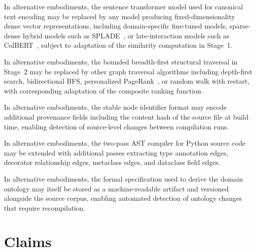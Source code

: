 \documentclass[12pt]{article}
\begin{document}
In alternative embodiments, the sentence transformer model used for canonical
text encoding may be replaced by any model producing fixed-dimensionality dense
vector representations, including domain-specific fine-tuned models,
sparse-dense hybrid models such as SPLADE~\cite{formal2021splade}, or
late-interaction models such as ColBERT~\cite{khattab2020colbert}, subject to
adaptation of the similarity computation in Stage~1.

In alternative embodiments, the bounded breadth-first structural traversal in
Stage~2 may be replaced by other graph traversal algorithms including depth-first
search, bidirectional BFS, personalized PageRank~\cite{page1999pagerank}, or
random walk with restart, with corresponding adaptation of the composite ranking
function.

In alternative embodiments, the stable node identifier format may encode
additional provenance fields including the content hash of the source file at
build time, enabling detection of source-level changes between compilation runs.

In alternative embodiments, the two-pass AST compiler for Python source code may
be extended with additional passes extracting type annotation edges, decorator
relationship edges, metaclass edges, and dataclass field edges.

In alternative embodiments, the formal specification used to derive the domain
ontology may itself be stored as a machine-readable artifact and versioned
alongside the source corpus, enabling automated detection of ontology changes
that require recompilation.

\newpage
\section*{Claims}
\end{document}
